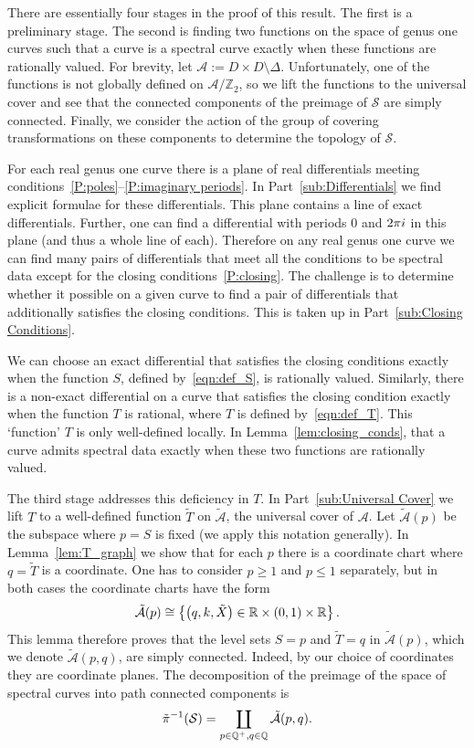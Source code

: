 \documentclass{article}
\begin{document}
There are essentially four stages in the proof of this result. The first is a preliminary stage. The second is finding two functions on the space of genus one curves such that a curve is a spectral curve exactly when these functions are rationally valued. For brevity, let $\mathcal{A} := D\times D\setminus \Delta$. Unfortunately, one of the functions is not globally defined on $\mathcal{A}/\mathbb{Z}_2$, so we lift the functions to the universal cover and see that the connected components of the preimage of $\mathcal{S}$ are simply connected. Finally, we consider the action of the group of covering transformations on these components to determine the topology of $\mathcal{S}$.

For each real genus one curve there is a plane of real differentials meeting conditions~\ref{P:poles}--\ref{P:imaginary periods}. In Part~\ref{sub:Differentials} we find explicit formulae for these differentials.
This plane contains a line of exact differentials. 
Further, one can find a differential with periods $0$ and $2\pi i$ in this plane (and thus a whole line of each). 
Therefore on any real genus one curve we can find many pairs of differentials that meet all the conditions to be spectral data except for the closing conditions~\ref{P:closing}.
The challenge is to determine whether it possible on a given curve to find a pair of differentials that additionally satisfies the closing conditions. This is taken up in Part~\ref{sub:Closing Conditions}.

We can choose an exact differential that satisfies the closing conditions exactly when the function $S$, defined by~\eqref{eqn:def_S}, is rationally valued.
Similarly, there is a non-exact differential on a curve that satisfies the closing condition exactly when the function $T$ is rational, where $T$ is defined by~\eqref{eqn:def_T}. This `function' $T$ is only well-defined locally. In Lemma~\ref{lem:closing_conds}, that a curve admits spectral data exactly when these two functions are rationally valued.

The third stage addresses this deficiency in $T$. In Part~\ref{sub:Universal Cover} we lift $T$ to a well-defined function $\tilde{T}$ on $\mathcal{\tilde{A}}$, the universal cover of $\mathcal{A}$. Let $\mathcal{\tilde{A}}(p)$ be the subspace where $p=S$ is fixed (we apply this notation generally). In Lemma~\ref{lem:T_graph} we show that for each $p$ there is a coordinate chart where $q=\tilde{T}$ is a coordinate. One has to consider $p \geq 1$ and $p \leq 1$ separately, but in both cases the coordinate charts have the form 
\[
\mathcal{\tilde{A}}(p) \cong \left\{ \left(q,k,\tilde{X}\right) \in \mathbb{R} \times (0,1) \times \mathbb{R} \right\}.
\]
This lemma therefore proves that the level sets $S = p$ and $\tilde{T} = q$ in $\mathcal{\tilde{A}}(p)$, which we denote $\mathcal{\tilde{A}}(p,q)$, are simply connected. Indeed, by our choice of coordinates they are coordinate planes. The decomposition of the preimage of the space of spectral curves into path connected components is
\[
\tilde{\pi}^{-1}(\mathcal{S}) = \coprod_{p \in \mathbb{Q}^+, q\in\mathbb{Q}} \mathcal{\tilde{A}}(p,q).
\]
\end{document}
